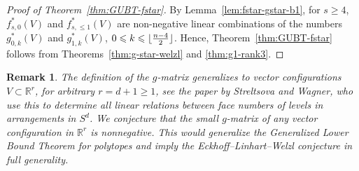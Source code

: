\documentclass[11pt]{article}
\newtheorem{remark}[theorem]{Remark}
\renewcommand{\leq}{\leqslant}
\renewcommand{\geq}{\geqslant}
\newcommand{\R}{\mathbb{R}}
\DeclarePairedDelimiter\floor{\lfloor}{\rfloor}
\begin{document}
\begin{proof}[Proof of Theorem~\ref{thm:GUBT-fstar}]
By Lemma~\ref{lem:fstar-gstar-b1}, for $s\geq 4$, $f_{s,0}^*(V)$ and $f_{s,\leq 1}^*(V)$ are non-negative linear combinations of the numbers $g^*_{0,k}(V)$ and $g^*_{1,k}(V)$, $0\leq k \leq \floor{\frac{n-4}{2}}$. Hence, Theorem~\ref{thm:GUBT-fstar} follows from Theorems~\ref{thm:g-star-welzl} and \ref{thm:g1-rank3}. 
\end{proof}
\begin{remark} The definition of the $g$-matrix generalizes to vector configurations $V\subset \R^r$, for arbitrary $r=d+1 \geq 1$, see the paper \cite{SW:DS} by Streltsova and Wagner, who use this to determine all linear relations between face numbers of levels in arrangements in $S^d$. We conjecture that the small $g$-matrix of any vector configuration in $\R^r$ is nonnegative. This would generalize the \emph{Generalized Lower Bound Theorem} for polytopes and imply the Eckhoff--Linhart--Welzl conjecture in full generality.
\end{remark}
%
\end{document}
